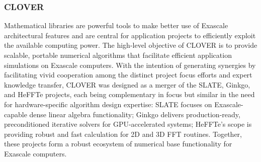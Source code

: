 \subsubsection{ CLOVER} 
Mathematical libraries are powerful tools to make better use of Exascale 
architectural features and are central for application projects to efficiently 
exploit the available computing power. The high-level objective of CLOVER is to 
provide scalable, portable numerical algorithms that facilitate efficient 
application simulations on Exascale computers. With the intention of generating synergies 
by facilitating vivid cooperation among the distinct project focus efforts 
and expert knowledge transfer, CLOVER was designed as a merger of the SLATE, 
Ginkgo, and HeFFTe projects, each being complementary 
in focus but similar in the need for hardware-specific algorithm design 
expertise: SLATE focuses on Exascale-capable dense linear algebra 
functionality; Ginkgo delivers production-ready, preconditioned iterative solvers for 
GPU-accelerated systems;
HeFFTe’s scope is providing robust and fast calculation for 2D 
and 3D FFT routines. Together, these projects form a robust ecosystem of numerical 
base functionality for Exascale computers.
\newpage
